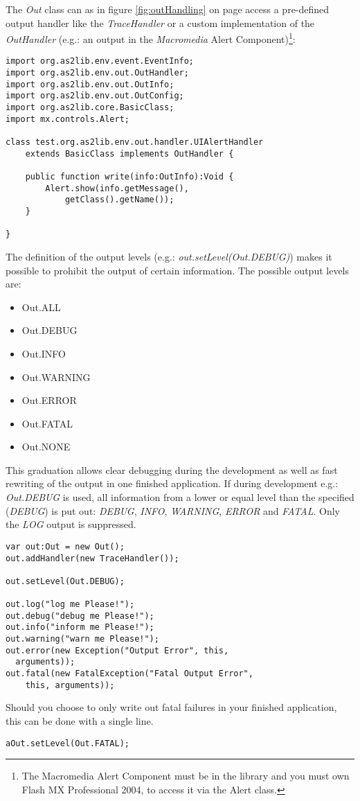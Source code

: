 The \emph{Out} class can as in figure \ref{fig:outHandling} on page \pageref{fig:outHandling} access a pre-defined output handler like the \emph{TraceHandler} or a custom implementation of the \emph{OutHandler} (e.g.: an output in the {\sl Macromedia} Alert Component)\footnote{The Macromedia Alert Component must be in the library and you must own Flash MX Professional 2004, to access it via the Alert class.}:

\begin{lstlisting}[frame=single]
import org.as2lib.env.event.EventInfo;
import org.as2lib.env.out.OutHandler;
import org.as2lib.env.out.OutInfo;
import org.as2lib.env.out.OutConfig;
import org.as2lib.core.BasicClass;
import mx.controls.Alert;

class test.org.as2lib.env.out.handler.UIAlertHandler 
	extends BasicClass implements OutHandler {

	public function write(info:OutInfo):Void {
		Alert.show(info.getMessage(), 
			getClass().getName());
	}

}
\end{lstlisting}

The definition of the output levels (e.g.: \emph{out.setLevel(Out.DEBUG)}) makes it possible to prohibit the output of certain information.
The possible output levels are:
\begin{itemize}
	\item Out.ALL
	\item Out.DEBUG
	\item Out.INFO
	\item Out.WARNING
	\item Out.ERROR
	\item Out.FATAL
	\item Out.NONE
\end{itemize}

This graduation allows clear debugging during the development as well as fast rewriting of the output in one finished application.
If during development e.g.: \emph{Out.DEBUG} is used, all information from a lower or equal level than the specified (\textit{DEBUG}) is put out: \textit{DEBUG}, \textit{INFO}, \textit{WARNING}, \textit{ERROR} and \textit{FATAL}. Only the \textit{LOG} output is suppressed.
\begin{lstlisting}[frame=single]
var out:Out = new Out();
out.addHandler(new TraceHandler());

out.setLevel(Out.DEBUG);

out.log("log me Please!");
out.debug("debug me Please!");
out.info("inform me Please!");
out.warning("warn me Please!");
out.error(new Exception("Output Error", this, 
  arguments));
out.fatal(new FatalException("Fatal Output Error",
	this, arguments));
\end{lstlisting}

Should you choose to only write out fatal failures in your finished application, this can be done with a single line.

\begin{lstlisting}[frame=single]
aOut.setLevel(Out.FATAL);
\end{lstlisting}
